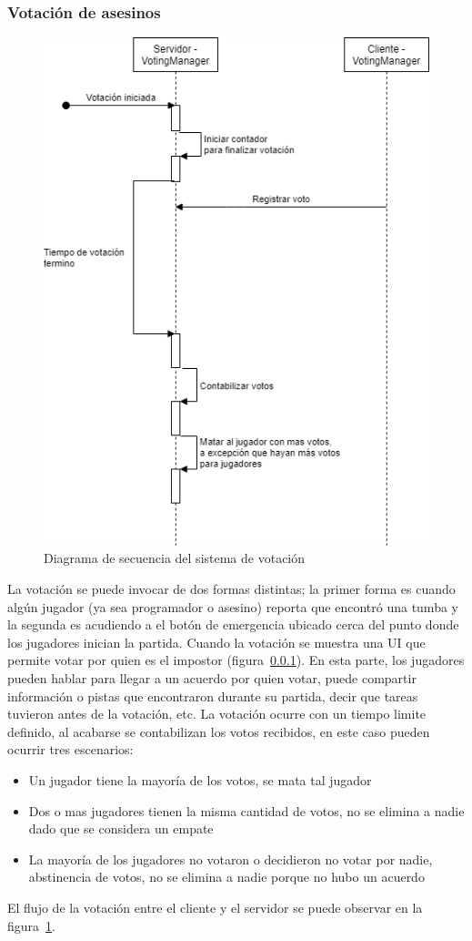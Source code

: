 \subsubsection{Votación de asesinos}
\begin{figure}[h]
    \centering
    \includegraphics[width=0.5\linewidth]{images/diagrama_secuencia_votos.png}
    \caption{Diagrama de secuencia del sistema de votación}
    \label{fig:diagrama_sec_votacion}
\end{figure}
La votación se puede invocar de dos formas distintas; la primer forma es cuando algún jugador (ya sea programador o asesino) reporta que encontró una tumba y la segunda es acudiendo a el botón de emergencia ubicado cerca del punto donde los jugadores inician la partida. Cuando la votación se muestra una UI que permite votar por quien es el impostor (figura~\ref{}). En esta parte, los jugadores pueden hablar para llegar a un acuerdo por quien votar, puede compartir información o pistas que encontraron durante su partida, decir que tareas tuvieron antes de la votación, etc. La votación ocurre con un tiempo limite definido, al acabarse se contabilizan los votos recibidos, en este caso pueden ocurrir tres escenarios:
\begin{itemize}
    \item Un jugador tiene la mayoría de los votos, se mata tal jugador
    \item Dos o mas jugadores tienen la misma cantidad de votos, no se elimina a nadie dado que se considera un empate
    \item La mayoría de los jugadores no votaron o decidieron no votar por nadie, abstinencia de votos, no se elimina a nadie porque no hubo un acuerdo
\end{itemize}
El flujo de la votación entre el cliente y el servidor se puede observar en la figura~\ref{fig:diagrama_sec_votacion}.

